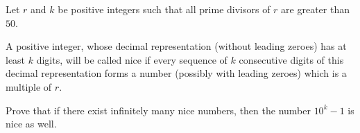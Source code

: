 Let $r$ and $k$ be positive integers such that all prime divisors of $r$ are greater than $50$.

A positive integer, whose decimal representation (without leading zeroes) has at least $k$ digits, will be called nice if every sequence of $k$ consecutive digits of this decimal representation forms a number (possibly with leading zeroes) which is a multiple of $r$.

Prove that if there exist infinitely many nice numbers, then the number $10^k-1$ is nice as well.